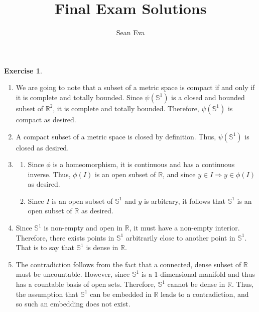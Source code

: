 \documentclass[11pt, letter]{amsart}
\title{Final Exam Solutions}
\author{Sean Eva}
\theoremstyle{definition}
\newtheorem{exercise}{Exercise}[]
\begin{document}
\maketitle

\begin{exercise}
\end{exercise}
\begin{enumerate}
    \item 

    We are going to note that a subset of a metric space is compact if and only if it is complete and totally bounded. Since $\psi(\mathbb{S}^1)$ is a closed and bounded subset of $\mathbb{R}^2$, it is complete and totally bounded. Therefore, $\psi(\mathbb{S}^1)$ is compact as desired.

    \item 

    A compact subset of a metric space is closed by definition. Thus, $\psi(\mathbb{S}^1)$ is closed as desired.

    \item 

    \begin{enumerate}
        \item 

        Since $\phi$ is a homeomorphism, it is continuous and has a continuous inverse. Thus, $\phi(I)$ is an open subset of $\mathbb{R}$, and since $y\in I \Rightarrow y\in \phi(I)$ as desired.

        \item 

        Since $I$ is an open subset of $\mathbb{S}^1$ and $y$ is arbitrary, it follows that $\mathbb{S}^1$ is an open subset of $\mathbb{R}$ as desired.
        
    \end{enumerate}

    \item 

    Since $\mathbb{S}^1$ is non-empty and open in $\mathbb{R}$, it must have a non-empty interior. Therefore, there exists points in $\mathbb{S}^1$ arbitrarily close to another point in $\mathbb{S}^1$. That is to say that $\mathbb{S}^1$ is dense in $\mathbb{R}$.

    \item 

    The contradiction follows from the fact that a connected, dense subset of $\mathbb{R}$ must be uncountable. However, since $\mathbb{S}^1$ is a 1-dimensional manifold and thus has a countable basis of open sets. Therefore, $\mathbb{S}^1$ cannot be dense in $\mathbb{R}$. Thus, the assumption that $\mathbb{S}^1$ can be embedded in $\mathbb{R}$ leads to a contradiction, and so such an embedding does not exist.
    
\end{enumerate}
\end{document}
